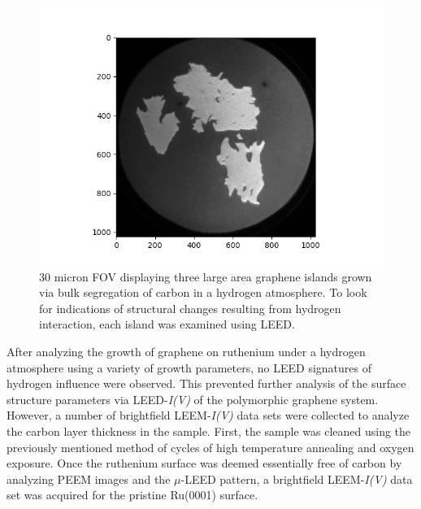  \begin{figure}
     \centering
     \includegraphics[scale=1.1]{./figs/LEEM-three-islands-with-H.png}
     \caption{30 micron FOV displaying three large area graphene islands grown via bulk segregation of carbon in a hydrogen atmosphere. To look for indications of structural changes resulting from hydrogen interaction, each island was examined using LEED.
     }
     \label{fig:three-islands}
\end{figure}

After analyzing the growth of graphene on ruthenium under a hydrogen atmosphere using a variety of growth parameters, no LEED signatures of hydrogen influence were observed. This prevented further analysis of the surface structure parameters via LEED-\textit{I(V)} of the polymorphic graphene system. However, a number of brightfield LEEM-\textit{I(V)} data sets were collected to analyze the carbon layer thickness in the sample. First, the sample was cleaned using the previously mentioned method of cycles of high temperature annealing and oxygen exposure. Once the ruthenium surface was deemed essentially free of carbon by analyzing PEEM images and the $\mu$-LEED pattern, a brightfield LEEM-\textit{I(V)} data set was acquired for the pristine Ru(0001) surface.

